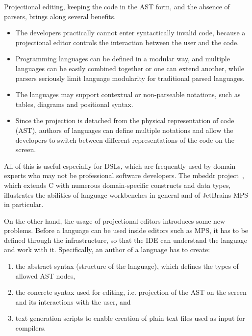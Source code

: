Projectional editing, keeping the code in the AST form, and the absence of parsers, brings along several benefits.
\begin{itemize}
	\item The developers practically cannot enter syntactically invalid code, because a projectional editor controls the interaction between the user and the code.
	\item Programming languages can be defined in a modular way, and multiple languages can be easily combined together or one can extend another, while parsers seriously limit language modularity for traditional parsed languages.
	\item The languages may support contextual or non-parseable notations, such as tables, diagrams and positional syntax. 
	\item Since the projection is detached from the physical representation of code (AST), authors of languages can define multiple notations and allow the developers to switch between different representations of the code on the screen.
\end{itemize}
All of this is useful especially for DSLs, which are frequently used by domain experts who may not be professional software developers.
The mbeddr project~\cite{ref:MBEDDR}, which extends C with numerous domain-specific constructs and data types, illustrates the abilities of language workbenches in general and of JetBrains MPS in particular.

On the other hand, the usage of projectional editors introduces some new problems.
Before a language can be used inside editors such as MPS, it has to be defined through the  infrastructure, so that the IDE can understand the language and work with it.
Specifically, an author of a language has to create:
\begin{enumerate}
	\item the abstract syntax (structure of the language), which defines the types of allowed AST nodes,
	\item the concrete syntax used for editing, i.e. projection of the AST on the screen and its interactions with the user, and
	\item text generation scripts to enable creation of plain text files used as input for compilers.
\end{enumerate}	

